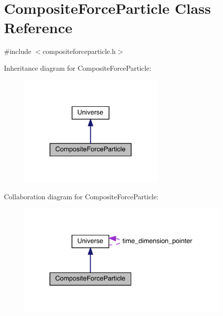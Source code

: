 \hypertarget{class_composite_force_particle}{}\section{Composite\+Force\+Particle Class Reference}
\label{class_composite_force_particle}


{\ttfamily \#include $<$compositeforceparticle.\+h$>$}



Inheritance diagram for Composite\+Force\+Particle\+:\nopagebreak
\begin{figure}[H]
\begin{center}
\leavevmode
\includegraphics[width=203pt]{class_composite_force_particle__inherit__graph}
\end{center}
\end{figure}


Collaboration diagram for Composite\+Force\+Particle\+:\nopagebreak
\begin{figure}[H]
\begin{center}
\leavevmode
\includegraphics[width=297pt]{class_composite_force_particle__coll__graph}
\end{center}
\end{figure}
